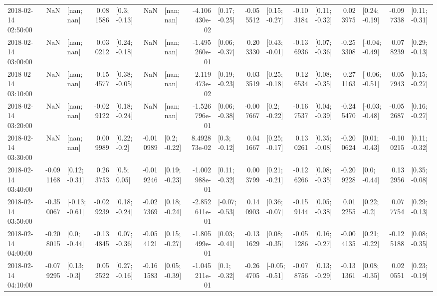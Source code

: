 \begin{tabular}{lrlrlrlrlrlrlrlrl}
2018-02-14 02:50:00 &       NaN &      [nan; nan] &  0.081586 &    [0.3; -0.13] &       NaN &      [nan; nan] & -4.106430e-02 &   [0.17; -0.25] & -0.055512 &   [0.15; -0.27] & -0.103184 &   [0.11; -0.32] &  0.023975 &   [0.24; -0.19] & -0.097338 &   [0.11; -0.31] \\
2018-02-14 03:00:00 &       NaN &      [nan; nan] &  0.030212 &   [0.24; -0.18] &       NaN &      [nan; nan] & -1.495260e-01 &   [0.06; -0.37] &  0.203330 &   [0.43; -0.01] & -0.136936 &   [0.07; -0.36] & -0.253308 &  [-0.04; -0.49] &  0.078239 &   [0.29; -0.13] \\
2018-02-14 03:10:00 &       NaN &      [nan; nan] &  0.154577 &   [0.38; -0.05] &       NaN &      [nan; nan] & -2.119473e-02 &   [0.19; -0.23] &  0.033519 &   [0.25; -0.18] & -0.126534 &   [0.08; -0.35] & -0.271163 &  [-0.06; -0.51] & -0.057943 &   [0.15; -0.27] \\
2018-02-14 03:20:00 &       NaN &      [nan; nan] & -0.029122 &   [0.18; -0.24] &       NaN &      [nan; nan] & -1.526796e-01 &   [0.06; -0.38] & -0.007667 &    [0.2; -0.22] & -0.167537 &   [0.04; -0.39] & -0.245470 &  [-0.03; -0.48] & -0.052687 &   [0.16; -0.27] \\
2018-02-14 03:30:00 &       NaN &      [nan; nan] &  0.009989 &    [0.22; -0.2] & -0.010989 &    [0.2; -0.22] &  8.492873e-02 &    [0.3; -0.12] &  0.041667 &   [0.25; -0.17] &  0.130261 &   [0.35; -0.08] & -0.200624 &   [0.01; -0.43] & -0.100215 &   [0.11; -0.32] \\
2018-02-14 03:40:00 & -0.091168 &   [0.12; -0.31] &  0.263753 &     [0.5; 0.05] & -0.019246 &   [0.19; -0.23] & -1.002988e-01 &   [0.11; -0.32] &  0.003799 &   [0.21; -0.21] & -0.126266 &   [0.08; -0.35] & -0.209228 &    [0.0; -0.44] &  0.132956 &   [0.35; -0.08] \\
2018-02-14 03:50:00 & -0.350067 &  [-0.13; -0.61] & -0.029239 &   [0.18; -0.24] & -0.027369 &   [0.18; -0.24] & -2.852611e-01 &  [-0.07; -0.53] &  0.140903 &   [0.36; -0.07] & -0.159144 &   [0.05; -0.38] &  0.012255 &    [0.22; -0.2] &  0.077754 &   [0.29; -0.13] \\
2018-02-14 04:00:00 & -0.208015 &    [0.0; -0.44] & -0.134845 &   [0.07; -0.36] & -0.054121 &   [0.15; -0.27] & -1.805499e-01 &   [0.03; -0.41] & -0.131629 &   [0.08; -0.35] & -0.051286 &   [0.16; -0.27] & -0.004135 &   [0.21; -0.22] & -0.125188 &   [0.08; -0.35] \\
2018-02-14 04:10:00 & -0.079295 &    [0.13; -0.3] &  0.052522 &   [0.27; -0.16] & -0.161583 &   [0.05; -0.39] & -1.045211e-01 &    [0.1; -0.32] & -0.264705 &  [-0.05; -0.51] & -0.078756 &   [0.13; -0.29] & -0.131361 &   [0.08; -0.35] &  0.020551 &   [0.23; -0.19] \\

\end{tabular}
